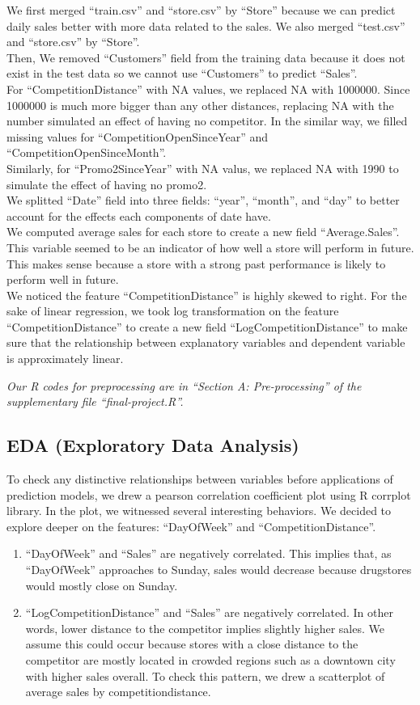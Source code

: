 \documentclass[letterpaper,twocolumn,11pt]{article}
\begin{document}
We first merged ``train.csv'' and ``store.csv'' by ``Store'' because we can predict daily sales better with more data related to the sales. We also merged ``test.csv'' and ``store.csv'' by ``Store''. \\
Then, We removed ``Customers'' field from the training data because it does not exist in the test data so we cannot use ``Customers'' to predict ``Sales''. \\
For ``CompetitionDistance'' with NA values, we replaced NA with 1000000. Since 1000000 is much more bigger than any other distances, replacing NA with the number simulated an effect of having no competitor. In the similar way, we filled missing values for ``CompetitionOpenSinceYear'' and ``CompetitionOpenSinceMonth''. \\
Similarly, for ``Promo2SinceYear'' with NA valus, we replaced NA with 1990 to simulate the effect of having no promo2. \\
We splitted ``Date'' field into three fields: ``year'', ``month'', and ``day'' to better account for the effects each components of date have. \\
We computed average sales for each store to create a new field ``Average.Sales''. This variable seemed to be an indicator of how well a store will perform in future. This makes sense because a store with a strong past performance is likely to perform well in future. \\
We noticed the feature ``CompetitionDistance'' is highly skewed to right. For the sake of linear regression, we took log transformation on the feature ``CompetitionDistance'' to create a new field ``LogCompetitionDistance'' to make sure that the relationship between explanatory variables and dependent variable is approximately linear.

\textit{Our R codes for preprocessing are in ``Section A: Pre-processing'' of the supplementary file ``final-project.R''.}

\subsection{EDA (Exploratory Data Analysis)}
To check any distinctive relationships between variables before applications of prediction models, we drew a pearson correlation coefficient plot using R corrplot library. In the plot, we witnessed several interesting behaviors. We decided to explore deeper on the features: ``DayOfWeek'' and ``CompetitionDistance''.
\begin{enumerate}
\item ``DayOfWeek'' and ``Sales'' are negatively correlated. This implies that, as ``DayOfWeek'' approaches to Sunday, sales would decrease because drugstores would mostly close on Sunday. 
\item ``LogCompetitionDistance'' and ``Sales'' are negatively correlated. In other words, lower distance to the competitor implies slightly higher sales. We assume this could occur because stores with a close distance to the competitor are mostly located in crowded regions such as a downtown city with higher sales overall. To check this pattern, we drew a scatterplot of average sales by competitiondistance. 
\end{enumerate}
\end{document}
